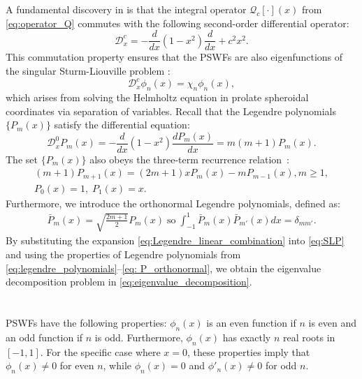 \documentclass[lettersize,journal]{IEEEtran}
\theoremstyle{plain}
\begin{document}
	
\appendices
\section{}
\label{appdix: PSWF_calculation_derivation}
A fundamental discovery in \cite{Slepian1961Prolate} is that the integral operator $\mathcal{Q}_c[\cdot](x)$ from \eqref{eq:operator_Q} commutes with the following second-order differential operator:
$$
	\mathcal{D}_x^c = -\frac{d}{dx}(1 - x^2)\frac{d}{dx} + c^2x^2.
	\label{eq:differential operator}
$$
This commutation property ensures that the PSWFs are also eigenfunctions of the singular Sturm-Liouville problem \cite{wang2017review}:
\begin{equation}
	\mathcal{D}_x^c\phi_n(x) = \chi_n\phi_n(x),	
	\label{eq:SLP}
\end{equation}
which arises from solving the Helmholtz equation in prolate spheroidal coordinates via separation of variables. Recall that the Legendre polynomials $\{P_m(x)\}$ satisfy the differential equation:
\begin{equation}
	\mathcal{D}_x^0 P_m(x) = -\frac{d}{dx}(1-x^2)\frac{dP_m(x)}{dx} = m(m+1)P_m(x).
	\label{eq:legendre_polynomials}
\end{equation}
The set $\{P_m(x)\}$ also obeys the three-term recurrence relation~\cite{szegö1975orthogonal}:
\begin{gather}
	(m+1)P_{m+1}(x) = (2m+1)xP_m(x) - mP_{m-1}(x), m \geq 1,\nonumber \\
	P_0(x) = 1, \; P_1(x) = x. \nonumber
	\label{eq:recurrence}
\end{gather}
Furthermore, we introduce the orthonormal Legendre polynomials, defined as:
\begin{align}
	\bar{P}_m(x) = \sqrt{\frac{2m+1}{2}}P_m(x)\; \text{so} \;
	\int_{-1}^{1}\bar{P}_m(x)\bar{P}_{m'}(x)dx = \delta_{mm'}.
	\label{eq: P_orthonormal}
\end{align}
By substituting the expansion \eqref{eq:Legendre_linear_combination} into \eqref{eq:SLP} and using the properties of Legendre polynomials from \eqref{eq:legendre_polynomials}–\eqref{eq: P_orthonormal}, we obtain the eigenvalue decomposition problem in \eqref{eq:eigenvalue_decomposition}.
	
\section{}
\label{appdix: PSWF_eigenvalue_computation}
PSWFs have the following properties: $\phi_n(x)$ is an even function if $n$ is even and an odd function if $n$ is odd. Furthermore, $\phi_n(x)$ has exactly $n$ real roots in $[-1, 1]$. 
For the specific case where $x = 0$, these properties imply that $\phi_n(x) \neq 0$ for even $n$, while $\phi_n(x) = 0$ and $\phi'_n(x) \neq 0$ for odd $n$. 
\end{document}
